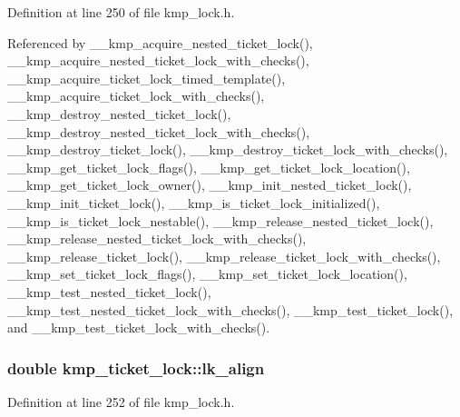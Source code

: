 Definition at line 250 of file kmp\-\_\-lock.\-h.



Referenced by \-\_\-\-\_\-kmp\-\_\-acquire\-\_\-nested\-\_\-ticket\-\_\-lock(), \-\_\-\-\_\-kmp\-\_\-acquire\-\_\-nested\-\_\-ticket\-\_\-lock\-\_\-with\-\_\-checks(), \-\_\-\-\_\-kmp\-\_\-acquire\-\_\-ticket\-\_\-lock\-\_\-timed\-\_\-template(), \-\_\-\-\_\-kmp\-\_\-acquire\-\_\-ticket\-\_\-lock\-\_\-with\-\_\-checks(), \-\_\-\-\_\-kmp\-\_\-destroy\-\_\-nested\-\_\-ticket\-\_\-lock(), \-\_\-\-\_\-kmp\-\_\-destroy\-\_\-nested\-\_\-ticket\-\_\-lock\-\_\-with\-\_\-checks(), \-\_\-\-\_\-kmp\-\_\-destroy\-\_\-ticket\-\_\-lock(), \-\_\-\-\_\-kmp\-\_\-destroy\-\_\-ticket\-\_\-lock\-\_\-with\-\_\-checks(), \-\_\-\-\_\-kmp\-\_\-get\-\_\-ticket\-\_\-lock\-\_\-flags(), \-\_\-\-\_\-kmp\-\_\-get\-\_\-ticket\-\_\-lock\-\_\-location(), \-\_\-\-\_\-kmp\-\_\-get\-\_\-ticket\-\_\-lock\-\_\-owner(), \-\_\-\-\_\-kmp\-\_\-init\-\_\-nested\-\_\-ticket\-\_\-lock(), \-\_\-\-\_\-kmp\-\_\-init\-\_\-ticket\-\_\-lock(), \-\_\-\-\_\-kmp\-\_\-is\-\_\-ticket\-\_\-lock\-\_\-initialized(), \-\_\-\-\_\-kmp\-\_\-is\-\_\-ticket\-\_\-lock\-\_\-nestable(), \-\_\-\-\_\-kmp\-\_\-release\-\_\-nested\-\_\-ticket\-\_\-lock(), \-\_\-\-\_\-kmp\-\_\-release\-\_\-nested\-\_\-ticket\-\_\-lock\-\_\-with\-\_\-checks(), \-\_\-\-\_\-kmp\-\_\-release\-\_\-ticket\-\_\-lock(), \-\_\-\-\_\-kmp\-\_\-release\-\_\-ticket\-\_\-lock\-\_\-with\-\_\-checks(), \-\_\-\-\_\-kmp\-\_\-set\-\_\-ticket\-\_\-lock\-\_\-flags(), \-\_\-\-\_\-kmp\-\_\-set\-\_\-ticket\-\_\-lock\-\_\-location(), \-\_\-\-\_\-kmp\-\_\-test\-\_\-nested\-\_\-ticket\-\_\-lock(), \-\_\-\-\_\-kmp\-\_\-test\-\_\-nested\-\_\-ticket\-\_\-lock\-\_\-with\-\_\-checks(), \-\_\-\-\_\-kmp\-\_\-test\-\_\-ticket\-\_\-lock(), and \-\_\-\-\_\-kmp\-\_\-test\-\_\-ticket\-\_\-lock\-\_\-with\-\_\-checks().

\hypertarget{unionkmp__ticket__lock_a76d2711b4f42f0a986efc2ec5d5e72a1}{
\subsubsection[{lk\-\_\-align}]{\setlength{\rightskip}{0pt plus 5cm}double kmp\-\_\-ticket\-\_\-lock\-::lk\-\_\-align}}\label{unionkmp__ticket__lock_a76d2711b4f42f0a986efc2ec5d5e72a1}


Definition at line 252 of file kmp\-\_\-lock.\-h.

